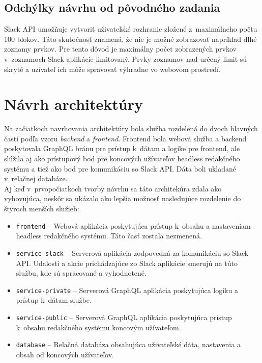 \subsection{Odchýlky návrhu od pôvodného zadania}
Slack API umožňuje vytvoriť uživateľské rozhranie zložené z~maximálneho počtu 100 blokov. Táto skutočnosť znamená, že nie je možné zobrazovať napríklad dlhé zoznamy prvkov. Pre tento dôvod je maximálny počet zobrazených prvkov v~zoznamoch Slack aplikácie limitovaný. Prvky zoznamov nad určený limit sú skryté a uzívateľ ich môže spravovať výhradne vo webovom prostredí. 

\section{Návrh architektúry}
\label{design:architecture}
Na začiatkoch navrhovania architektúry bola služba rozdelená do dvoch hlavných častí podľa vzoru \emph{backend} a \emph{frontend}. Frontend bola webová služba a backend poskytovala GraphQL bránu pre prístup k~dátam a logike pre frontend, ale slúžila aj ako prístupový bod pre koncových užívateľov headless redakčného systému a tiež ako bod pre komunikáciu so Slack API. Dáta boli ukladané v~relačnej databáze. \\

\noindent Aj keď v~prvopočiatkoch tvorby návrhu sa táto architekúra zdala ako vyhovujúca, neskôr sa ukázalo ako lepšia možnosť nasledujúce rozdelenie do štyroch menších služieb:

\begin{itemize}
	\item \texttt{frontend} -- Webová aplikácia poskytujúca prístup k~obsahu a nastaveniam headless redakčného systému. Táto časť zostala nezmenená.
	\item \texttt{service-slack} -- Serverová aplikácia zodpovedná za komunikáciu so Slack API. Udalosti a akcie prichádzajúce zo Slack aplikácie smerujú na túto službu, kde sú spracované a vyhodnotené.
	\item \texttt{service-private} -- Serverová GraphQL aplikácia poskytujúca logiku a prístup k~dátam  službe.
	\item \texttt{service-public} -- Serverová GraphQL aplikácia poskytujúca prístup k~obsahu redakčného systému koncovým užívateľom.
	\item \texttt{database} -- Relačná databáza obsahujúca uživateľské dáta, nastavenia a obsah od koncových užívateľov.
\end{itemize}

